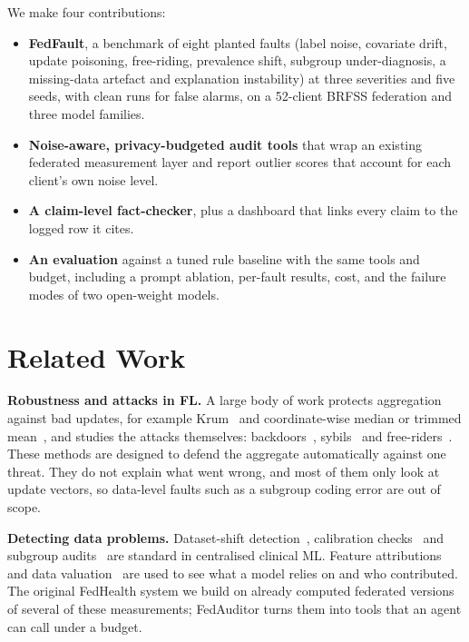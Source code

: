 \documentclass[conference]{IEEEtran}
\begin{document}
We make four contributions:
\begin{itemize}
\item \textbf{FedFault}, a benchmark of eight planted faults (label noise, covariate drift, update
  poisoning, free-riding, prevalence shift, subgroup under-diagnosis, a missing-data artefact and
  explanation instability) at three severities and five seeds, with clean runs for false alarms, on
  a 52-client BRFSS federation and three model families.
\item \textbf{Noise-aware, privacy-budgeted audit tools} that wrap an existing federated measurement
  layer and report outlier scores that account for each client's own noise level.
\item \textbf{A claim-level fact-checker}, plus a dashboard that links every claim to the logged row
  it cites.
\item \textbf{An evaluation} against a tuned rule baseline with the same tools and budget, including
  a prompt ablation, per-fault results, cost, and the failure modes of two open-weight models.
\end{itemize}

\section{Related Work}

\textbf{Robustness and attacks in FL.} A large body of work protects aggregation against bad
updates, for example Krum~\cite{blanchard2017krum} and coordinate-wise median or trimmed
mean~\cite{yin2018byzantine}, and studies the attacks themselves: backdoors~\cite{bagdasaryan2020backdoor},
sybils~\cite{fung2020sybil} and free-riders~\cite{fraboni2021freerider}. These methods are designed
to defend the aggregate automatically against one threat. They do not explain what went wrong, and
most of them only look at update vectors, so data-level faults such as a subgroup coding error are
out of scope.

\textbf{Detecting data problems.} Dataset-shift detection~\cite{rabanser2019failing},
calibration checks~\cite{vancalster2019calibration} and subgroup audits~\cite{obermeyer2019dissecting}
are standard in centralised clinical ML. Feature attributions~\cite{lundberg2017shap} and data
valuation~\cite{ghorbani2019shapley} are used to see what a model relies on and who contributed.
The original FedHealth system we build on already computed federated versions of several of these
measurements; FedAuditor turns them into tools that an agent can call under a budget.
\end{document}
